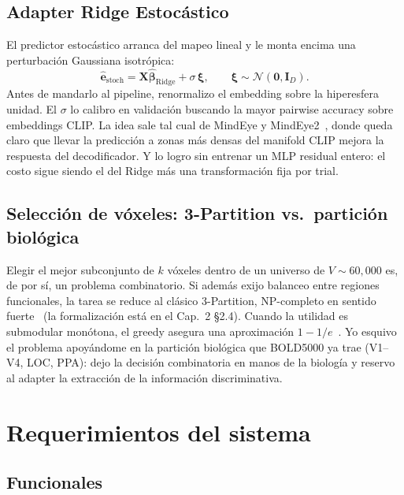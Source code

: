 \subsection{Adapter Ridge Estocástico}

El predictor estocástico arranca del mapeo lineal y le monta encima una perturbación Gaussiana isotrópica:
\begin{equation}
\hat{\mathbf{e}}_{\mathrm{stoch}} = \mathbf{X}\hat{\boldsymbol{\beta}}_{\mathrm{Ridge}} + \sigma\,\boldsymbol{\xi}, \qquad \boldsymbol{\xi}\sim\mathcal{N}(\mathbf{0},\mathbf{I}_{D}).
\end{equation}
Antes de mandarlo al pipeline, renormalizo el embedding sobre la hiperesfera unidad. El $\sigma$ lo calibro en validación buscando la mayor pairwise accuracy sobre embeddings CLIP. La idea sale tal cual de MindEye y MindEye2~\cite{scotti2023mindeye,scotti2024mindeye2}, donde queda claro que llevar la predicción a zonas más densas del manifold CLIP mejora la respuesta del decodificador. Y lo logro sin entrenar un MLP residual entero: el costo sigue siendo el del Ridge más una transformación fija por trial.

\subsection{Selección de vóxeles: 3-Partition vs.\ partición biológica}

Elegir el mejor subconjunto de $k$ vóxeles dentro de un universo de $V \sim 60{,}000$ es, de por sí, un problema combinatorio. Si además exijo balanceo entre regiones funcionales, la tarea se reduce al clásico 3-Partition, NP-completo en sentido fuerte~\cite{garey1979computers} (la formalización está en el Cap.~2 \S2.4). Cuando la utilidad es submodular monótona, el greedy asegura una aproximación $1-1/e$~\cite{nemhauser1978,krause2014submodular}. Yo esquivo el problema apoyándome en la partición biológica que BOLD5000 ya trae (V1--V4, LOC, PPA): dejo la decisión combinatoria en manos de la biología y reservo al adapter la extracción de la información discriminativa.

\section{Requerimientos del sistema}

\subsection{Funcionales}

